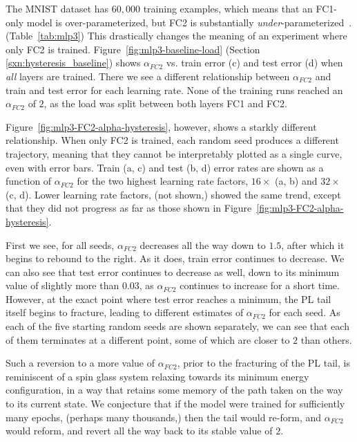 The MNIST dataset has $60,000$ training examples, which means that an FC1-only model is over-parameterized, but FC2 is 
substantially \emph{under}-parameterized~\cite{DLM19_Exact_TR}. (Table~\ref{tab:mlp3}) This drastically changes the 
meaning of an experiment where only FC2 is trained. Figure~\ref{fig:mlp3-baseline-load} (Section 
\ref{sxn:hysteresis_baseline}) shows $\alpha_{FC2}$ vs. train error (c) and test error (d) when \emph{all} layers are 
trained. There we see a different relationship between $\alpha_{FC2}$ and train and test error for each learning rate. 
None of the training runs reached an $\alpha_{FC2}$ of $2$, as the load was split between both layers FC1 and FC2.

Figure~\ref{fig:mlp3-FC2-alpha-hysteresis}, however, shows a starkly different relationship. 
When only FC2 is trained, 
each random seed produces a different trajectory, meaning that they cannot be interpretably plotted as a single curve, even with error 
bars. Train (a, c) and test (b, d) error rates are shown as a function of $\alpha_{FC2}$ for the two highest learning 
rate factors, $16\times$ (a, b) and $32\times$ (c, d). Lower learning rate factors, (not shown,) showed the same trend, except 
that they did not progress as far as those shown in Figure~\ref{fig:mlp3-FC2-alpha-hysteresis}.

First we see, for all seeds, $\alpha_{FC2}$ decreases all the way down to $1.5$, after which it begins to rebound to the 
right. As it 
does, train error continues to decrease. We can also see that test error continues to decrease as well, down to its minimum 
value of slightly more than $0.03$, as $\alpha_{FC2}$ continues to increase for a short time. However, at the exact 
point where test error reaches a minimum, the PL tail itself begins to fracture, leading to different estimates 
of $\alpha_{FC2}$ for each seed. As each of the five starting random seeds are shown separately, we can see that each of 
them terminates at a different point, some of which are closer to $2$ than others.

Such a reversion to a more \Typical value of $\alpha_{FC2}$, prior to the fracturing of the PL tail, is 
reminiscent of a spin glass system relaxing towards its minimum energy configuration, in a way that retains some memory 
of the path taken on the way to its current state. 
We conjecture that if the model were trained for sufficiently many 
epochs, (perhaps many thousands,) then the tail would re-form, and $\alpha_{FC2}$ would reform, and revert all the way back to its 
stable value of $2$.

